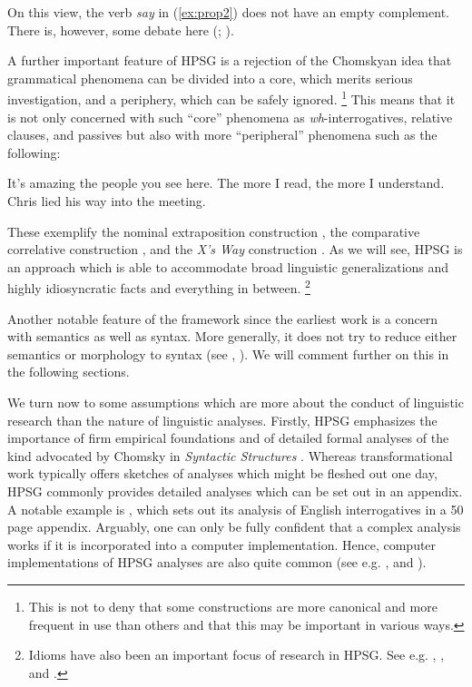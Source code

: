 \documentclass[output=paper
	        ,collection
	        ,collectionchapter
 	        ,biblatex
                ,babelshorthands
                ,newtxmath
                ,draftmode
                ,colorlinks, citecolor=brown
]{langscibook}
\begin{document}
On this view, the verb \emph{say} in (\ref{ex:prop2}) does not have an empty complement. There is, however, some debate here (\citealp{SF94a,Mueller2004e}; ).

A further important feature of HPSG is a rejection of the Chomskyan idea that grammatical phenomena can be divided into a core, which merits serious investigation, and a periphery, which can be safely ignored.%
%
\footnote{This is not to deny that some constructions are more canonical and more frequent in use than others and that this may be important in various ways.}
%
This means that it is not only concerned with such ``core'' phenomena as \emph{wh}-interrogatives, relative clauses, and passives but also with more ``peripheral'' phenomena such as the following:


\ea\label{ex:prop3}
	\ea\label{ex:prop3a}
	It’s amazing the people you see here.
	\ex\label{ex:prop3b}
	The more I read, the more I understand.
	\ex\label{ex:prop3c}
	Chris lied his way into the meeting.
	\z
\z

These exemplify the nominal extraposition construction \citep{ML96a}, the comparative correlative construction \citep{Abeille2006a,AB2008a-u,Borsley2011a-u}, and the \emph{X’s Way} construction \citep[7.4]{KF99a,Sag2012a}. As we will see, HPSG is an approach which is able to accommodate broad linguistic generalizations and highly idiosyncratic facts and everything in between.%
%
\footnote{Idioms have also been an important focus of research in HPSG. See e.g. , , and .}
%

Another notable feature of the framework since the earliest work is a concern with semantics as well as syntax. More generally, it does not try to reduce either semantics or morphology to syntax (see , ). We will comment further on this in the following sections.

We turn now to some assumptions which are more about the conduct of linguistic research than the nature of linguistic analyses. Firstly, HPSG emphasizes the importance of firm empirical foundations and of detailed formal analyses of the kind advocated by Chomsky in \emph{Syntactic Structures} \citep{Chomsky57a}. Whereas transformational work typically offers sketches of analyses which might be fleshed out one day, HPSG commonly provides detailed analyses which can be set out in an appendix. A notable example is \citet{GSag2000a-u}, which sets out its analysis of English interrogatives in a 50 page appendix. Arguably, one can only be fully confident that a complex analysis works if it is incorporated into a computer implementation. Hence, computer implementations of HPSG analyses are also quite common (see e.g. \citealp{Babel,MuellerCoreGram,Copestake2002a,BDFPS2010a-u,Bender2016}, and ).
\end{document}
